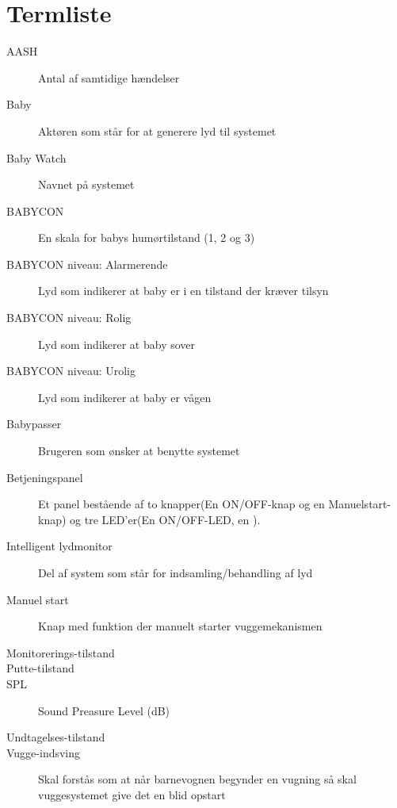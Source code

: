 \chapter{Termliste}


\begin{description}
\item[AASH] Antal af samtidige hændelser
\item[Baby] Aktøren som står for at generere lyd til systemet
\item[Baby Watch] Navnet på systemet
\item[BABYCON] En skala for babys humørtilstand (1, 2 og 3)
\item[BABYCON niveau: Alarmerende] Lyd som indikerer at baby er i en tilstand der kræver tilsyn
\item[BABYCON niveau: Rolig] Lyd som indikerer at baby sover
\item[BABYCON niveau: Urolig] Lyd som indikerer at baby er vågen
\item[Babypasser] Brugeren som ønsker at benytte systemet
\item[Betjeningspanel]Et panel bestående af to knapper(En ON/OFF-knap og en Manuelstart-knap) og tre LED'er(En ON/OFF-LED, en ). 
\item[Intelligent lydmonitor] Del af system som står for indsamling/behandling af lyd
\item[Manuel start] Knap med funktion der manuelt starter vuggemekanismen

\item[Monitorerings-tilstand] 
\item[Putte-tilstand]
\item[SPL] Sound Preasure Level (dB)
\item[Undtagelses-tilstand]
\item[Vugge-indsving] Skal forstås som at når barnevognen begynder en vugning så skal vuggesystemet give det en blid opstart





\end{description}